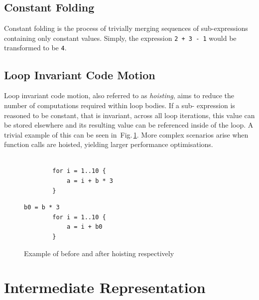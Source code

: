 \documentclass[12pt,openany,a4paper]{book}
\newcommand{\fig}[1]  {Fig.\,\ref{#1}}		%
\begin{document}
\subsection{Constant Folding}
\label{cf}

Constant folding is the process of trivially merging sequences of sub-expressions 
containing only constant values. Simply, the expression \verb|2 + 3 - 1| would be 
transformed to be \verb|4|.

\subsection{Loop Invariant Code Motion}
\label{licm}

Loop invariant code motion, also referred to as \emph{hoisting}, aims to reduce
the number of computations required within loop bodies. If a sub-
expression is reasoned to be constant, that is invariant, across all loop iterations, 
this value can be stored elsewhere and its resulting value can be referenced inside of the
loop. A trivial example of this can be seen in~\fig{hoist}. More complex scenarios
arise when function calls are hoisted, yielding larger performance optimisations.

\begin{figure}
    \begin{minipage}[l]{0.4\linewidth}
        \begin{lstlisting}[frame=single, basicstyle=\ttfamily\small, tabsize=1, columns=fullflexible]

        for i = 1..10 {
            a = i + b * 3
        }
        \end{lstlisting}
    \end{minipage}
    \hspace{0.18\textwidth}
    \begin{minipage}[l]{0.4\linewidth}
        \begin{lstlisting}[frame=single, basicstyle=\ttfamily\small, tabsize=1, columns=fullflexible]
        b0 = b * 3
        for i = 1..10 {
            a = i + b0
        }
        \end{lstlisting}
    \end{minipage}
    \caption{Example of before and after hoisting respectively}
    \label{hoist}
\end{figure}

\section{Intermediate Representation}
\label{ir}
\end{document}

